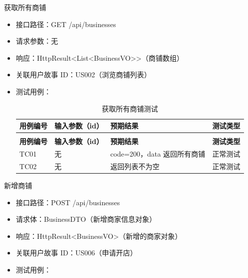 \begin{levellist}
\begin{levellist}
        \item 获取所有商铺
        \begin{itemize}
            \item 接口路径：GET /api/businesses
            \item 请求参数：无
            \item 响应：HttpResult<List<BusinessVO>>（商铺数组）
            \item 关联用户故事 ID：US002（浏览商铺列表）
            \item 测试用例：
                  \begin{longtable}{>{\centering\arraybackslash}m{2cm} >{\centering\arraybackslash}m{4cm} >{\centering\arraybackslash}m{5cm} >{\centering\arraybackslash}m{2cm}}

                      \caption{获取所有商铺测试} \label{tab:training}                                  \\

                      \toprule
                      \textbf{用例编号} & \textbf{输入参数（id）} & \textbf{预期结果}        & \textbf{测试类型} \\
                      \midrule
                      \endfirsthead

                      \multicolumn{4}{c}{{\tablename\ \thetable{} 续表}}                         \\
                      \toprule
                      \textbf{用例编号} & \textbf{输入参数（id）} & \textbf{预期结果}        & \textbf{测试类型} \\
                      \midrule
                      \endhead

                      \bottomrule
                      \endfoot

                      TC01          & 无                 & code=200，data 返回所有商铺 & 正常测试          \\
                      TC02          & 无                 & 返回列表不为空              & 正常测试          \\
                  \end{longtable}
        \end{itemize}

        \item 新增商铺
        \begin{itemize}
            \item 接口路径：POST /api/businesses
            \item 请求体：BusinessDTO（新增商家信息对象）
            \item 响应：HttpResult<BusinessVO>（新增的商家对象）
            \item 关联用户故事 ID：US006（申请开店）
            \item 测试用例：
                  \begin{longtable}{>{\centering\arraybackslash}m{2cm} >{\centering\arraybackslash}m{4cm} >{\centering\arraybackslash}m{5cm} >{\centering\arraybackslash}m{2cm}}


\end{longtable}
\end{itemize}
\end{levellist}
\end{levellist}

